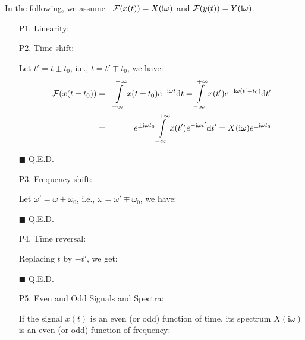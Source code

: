 	In the following, we assume 
	$\;\;{\cal F}(x(t))=X(\mathrm{i}\omega)$ and ${\cal F}(y(t))=Y(\mathrm{i}\omega)$.
	
	\begin{itemize}
	
	\item[P1.] Linearity:
	
	
	\item[P2.] Time shift:
	
	\begin{dem} Let $t'=t\pm t_0$, i.e., $t = t' \mp t_0$, we have:
	\begin{eqnarray}
	{\cal F}(x(t \pm t_0))&=&\int\limits_{-\infty}^{+\infty} x(t\pm t_0)
		e^{-\mathrm{i}\omega t} \mathrm{d}t
		=\int\limits_{-\infty}^{+\infty} x(t')e^{-\mathrm{i}\omega(t'\mp t_0)} \mathrm{d}t'
		\nonumber \\
		&=& e^{\pm \mathrm{i}\omega t_0}
		\int\limits_{-\infty}^{+\infty} x(t')e^{-\mathrm{i}\omega t'} \mathrm{d}t'=X(\mathrm{i}\omega)e^{\pm \mathrm{i}\omega t_0}
		\nonumber
	\end{eqnarray}
	\begin{flushright}
		$\blacksquare$  Q.E.D.
	\end{flushright}
	\end{dem}
	
	\item[P3.] Frequency shift:
	
	\begin{dem} Let $\omega'=\omega\pm \omega_0$, i.e., $\omega = \omega'\mp\omega_0$,
	we have:
	
	\begin{flushright}
		$\blacksquare$  Q.E.D.
	\end{flushright}
	\end{dem}
	
	\item[P4.] Time reversal:
	
	\begin{dem}
	
	Replacing $t$ by $-t'$, we get:
	
	\begin{flushright}
		$\blacksquare$  Q.E.D.
	\end{flushright}
	\end{dem}
	
	\item[P5.] Even and Odd Signals and Spectra:
	
	If the signal $x(t)$ is an even (or odd) function of time, its spectrum $X(\mathrm{i}\omega)$ is an even (or odd) function of frequency:
	

\end{itemize}
